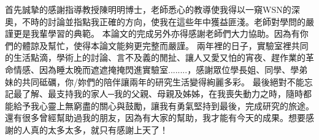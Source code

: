 
	首先誠摯的感謝指導教授陳明明博士，老師悉心的教導使我得以一窺WSN的深奧，不時的討論並指點我正確的方向，使我在這些年中獲益匪淺。老師對學問的嚴謹更是我輩學習的典範。
    本論文的完成另外亦得感謝老師們大力協助。因為有你們的體諒及幫忙，使得本論文能夠更完整而嚴謹。
 兩年裡的日子，實驗室裡共同的生活點滴，學術上的討論、言不及義的閒扯、讓人又愛又怕的宵夜、趕作業的革命情感、因為睡太晚而遮遮掩掩閃進實驗室........，感謝眾位學長姐、同學、學弟妹的共同砥礪，你/妳們的陪伴讓兩年的研究生活變得絢麗多彩。
	最後絕對不能忘記最了解、最支持我的家人─我的父親、母親及姊姊，在我喪失動力之時，隨時都能給予我心靈上無窮盡的關心與鼓勵，讓我有勇氣堅持到最後，完成研究的旅途。還有很多曾經幫助過我的朋友，因為有大家的幫助，我才能有今天的成果。想要感謝的人真的太多太多，就只有感謝上天了！




